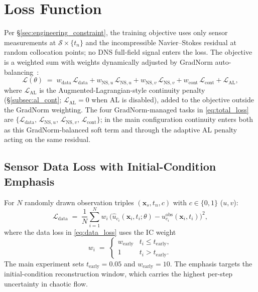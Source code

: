 \section{Loss Function}
\label{sec:loss}

Per \S\ref{sec:engineering_constraint}, the training objective uses only sensor measurements at $\mathcal{S}\times\{t_n\}$ and the incompressible Navier--Stokes residual at random collocation points; no DNS full-field signal enters the loss. The objective is a weighted sum with weights dynamically adjusted by GradNorm auto-balancing~\cite{Chen2018ICML}:
\begin{equation}
    \label{eq:total_loss}
    \mathcal{L}(\theta) \;=\; w_{\text{data}}\,\mathcal{L}_{\text{data}}
                  + w_{\text{NS},u}\,\mathcal{L}_{\text{NS},u}
                  + w_{\text{NS},v}\,\mathcal{L}_{\text{NS},v}
                  + w_{\text{cont}}\,\mathcal{L}_{\text{cont}}
                  + \mathcal{L}_{\text{AL}},
\end{equation}
where $\mathcal{L}_{\text{AL}}$ is the Augmented-Lagrangian-style continuity penalty (\S\ref{subsec:al_cont}; $\mathcal{L}_{\text{AL}}=0$ when AL is disabled), added to the objective outside the GradNorm weighting. The four GradNorm-managed tasks in \eqref{eq:total_loss} are $\{\mathcal{L}_{\text{data}},\, \mathcal{L}_{\text{NS},u},\, \mathcal{L}_{\text{NS},v},\, \mathcal{L}_{\text{cont}}\}$; in the main configuration continuity enters both as this GradNorm-balanced soft term and through the adaptive AL penalty acting on the same residual.

\subsection{Sensor Data Loss with Initial-Condition Emphasis}

For $N$ randomly drawn observation triples $(\mathbf{x}_s, t_n, c)$ with $c \in \{0, 1\}$ ($u, v$):
\begin{equation}
    \label{eq:data_loss}
    \mathcal{L}_{\text{data}} \;=\; \frac{1}{N}\sum_{i=1}^{N} w_i\,\Big(\hat{u}_{c_i}(\mathbf{x}_i,t_i;\theta) - u^{\text{obs}}_{c_i}(\mathbf{x}_i,t_i)\Big)^2,
\end{equation}
where the data loss in \eqref{eq:data_loss} uses the IC weight
\begin{equation}
    w_i \;=\; \begin{cases} w_{\text{early}} & t_i \le t_{\text{early}},\\ 1 & t_i > t_{\text{early}}.\end{cases}
\end{equation}
The main experiment sets $t_{\text{early}} = 0.05$ and $w_{\text{early}} = 10$. The emphasis targets the initial-condition reconstruction window, which carries the highest per-step uncertainty in chaotic flow.

